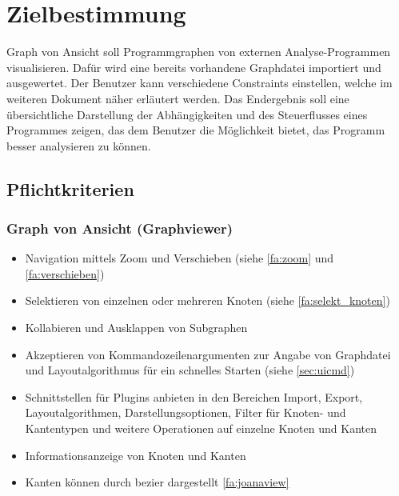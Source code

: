 \chapter{Zielbestimmung}

Graph von Ansicht soll Programmgraphen von externen Analyse-Programmen visualisieren. Dafür wird eine bereits vorhandene Graphdatei importiert und ausgewertet. Der Benutzer kann verschiedene Constraints einstellen, welche im weiteren Dokument näher erläutert werden.
Das Endergebnis soll eine übersichtliche Darstellung der Abhängigkeiten und des Steuerflusses eines Programmes zeigen, das dem Benutzer die Möglichkeit bietet, das Programm besser analysieren zu können.

\section{Pflichtkriterien}

\subsection{Graph von Ansicht (Graphviewer)}
  \begin{itemize}
    \item Navigation mittels Zoom und Verschieben (siehe \ref{fa:zoom} und \ref{fa:verschieben})
    \item Selektieren von einzelnen oder mehreren Knoten (siehe \ref{fa:selekt_knoten})
    \item Kollabieren und Ausklappen von Subgraphen %
    \item Akzeptieren von Kommandozeilenargumenten zur Angabe von Graphdatei und Layoutalgorithmus für ein schnelles Starten (siehe \ref{sec:uicmd})
    \item Schnittstellen für Plugins anbieten in den Bereichen Import, Export, Layoutalgorithmen, Darstellungsoptionen, Filter für Knoten- und Kantentypen und weitere Operationen auf einzelne Knoten und Kanten
    \item Informationsanzeige von Knoten und Kanten
    \item Kanten können durch \gls{bezier} dargestellt \ref{fa:joanaview}
  \end{itemize}
  
